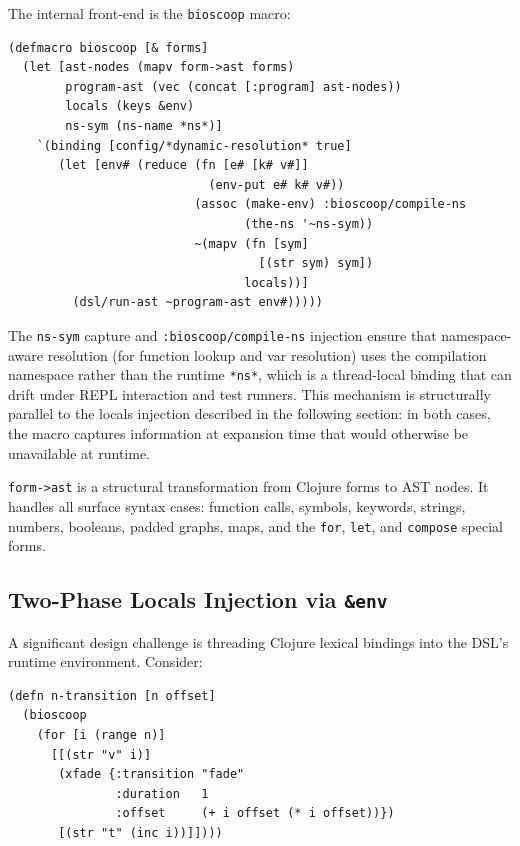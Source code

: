 \documentclass[english,submission]{programming}
\begin{document}
The internal front-end is the \texttt{bioscoop} macro:

\begin{lstlisting}[caption={The bioscoop macro}]
(defmacro bioscoop [& forms]
  (let [ast-nodes (mapv form->ast forms)
        program-ast (vec (concat [:program] ast-nodes))
        locals (keys &env)
        ns-sym (ns-name *ns*)]
    `(binding [config/*dynamic-resolution* true]
       (let [env# (reduce (fn [e# [k# v#]]
                            (env-put e# k# v#))
                          (assoc (make-env) :bioscoop/compile-ns
                                 (the-ns '~ns-sym))
                          ~(mapv (fn [sym]
                                   [(str sym) sym])
                                 locals))]
         (dsl/run-ast ~program-ast env#)))))
\end{lstlisting}

The \texttt{ns-sym} capture and \texttt{:bioscoop/compile-ns} injection ensure that namespace-aware resolution (for function lookup and var resolution) uses the compilation namespace rather than the runtime \texttt{*ns*}, which is a thread-local binding that can drift under REPL interaction and test runners. This mechanism is structurally parallel to the locals injection described in the following section: in both cases, the macro captures information at expansion time that would otherwise be unavailable at runtime.

\texttt{form->ast} is a structural transformation from Clojure forms to AST nodes. It handles all surface syntax cases: function calls, symbols, keywords, strings, numbers, booleans, padded graphs, maps, and the \texttt{for}, \texttt{let}, and \texttt{compose} special forms.

\subsection{Two-Phase Locals Injection via \texttt{\&env}}

A significant design challenge is threading Clojure lexical bindings into the DSL's runtime environment. Consider:

\begin{lstlisting}[caption={Parameterized iteration with lexical scope}]
(defn n-transition [n offset]
  (bioscoop
    (for [i (range n)]
      [[(str "v" i)]
       (xfade {:transition "fade"
               :duration   1
               :offset     (+ i offset (* i offset))})
       [(str "t" (inc i))]])))
\end{lstlisting}
\end{document}
